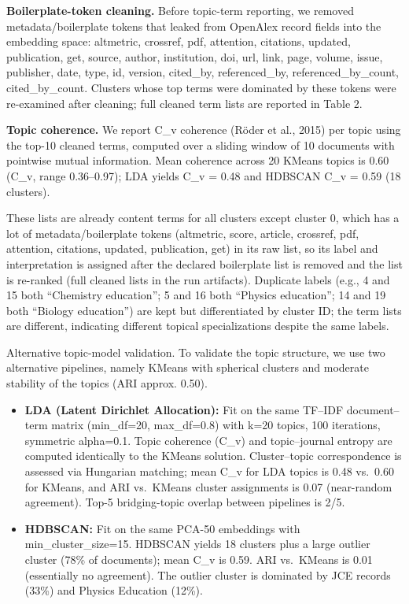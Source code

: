 \documentclass[pdflatex,sn-apa]{sn-jnl}
\providecommand{\tightlist}{\setlength{\itemsep}{0pt}\setlength{\parskip}{0pt}}
\begin{document}
\textbf{Boilerplate-token cleaning.} Before topic-term reporting, we
removed metadata/boilerplate tokens that leaked from OpenAlex record
fields into the embedding space: altmetric, crossref, pdf, attention,
citations, updated, publication, get, source, author, institution, doi,
url, link, page, volume, issue, publisher, date, type, id, version,
cited\_by, referenced\_by, referenced\_by\_count, cited\_by\_count.
Clusters whose top terms were dominated by these tokens were re-examined
after cleaning; full cleaned term lists are reported in Table 2.

\textbf{Topic coherence.} We report C\_v coherence (Röder et al., 2015)
per topic using the top-10 cleaned terms, computed over a sliding window
of 10 documents with pointwise mutual information. Mean coherence across
20 KMeans topics is 0.60 (C\_v, range 0.36--0.97); LDA yields C\_v =
0.48 and HDBSCAN C\_v = 0.59 (18 clusters).

These lists are already content terms for all clusters except cluster 0,
which has a lot of metadata/boilerplate tokens (altmetric, score,
article, crossref, pdf, attention, citations, updated, publication, get)
in its raw list, so its label and interpretation is assigned after the
declared boilerplate list is removed and the list is re-ranked (full
cleaned lists in the run artifacts). Duplicate labels (e.g., 4 and 15
both ``Chemistry education''; 5 and 16 both ``Physics education''; 14
and 19 both ``Biology education'') are kept but differentiated by
cluster ID; the term lists are different, indicating different topical
specializations despite the same labels.

Alternative topic-model validation. To validate the topic structure, we
use two alternative pipelines, namely KMeans with spherical clusters and
moderate stability of the topics (ARI approx. 0.50).

\begin{itemize}
\tightlist
\item
  \textbf{LDA (Latent Dirichlet Allocation):} Fit on the same TF--IDF
  document--term matrix (min\_df=20, max\_df=0.8) with k=20 topics, 100
  iterations, symmetric alpha=0.1. Topic coherence (C\_v) and
  topic--journal entropy are computed identically to the KMeans
  solution. Cluster--topic correspondence is assessed via Hungarian
  matching; mean C\_v for LDA topics is 0.48 vs.~0.60 for KMeans, and
  ARI vs.~KMeans cluster assignments is 0.07 (near-random agreement).
  Top-5 bridging-topic overlap between pipelines is 2/5.
\item
  \textbf{HDBSCAN:} Fit on the same PCA-50 embeddings with
  min\_cluster\_size=15. HDBSCAN yields 18 clusters plus a large outlier
  cluster (78\% of documents); mean C\_v is 0.59. ARI vs.~KMeans is 0.01
  (essentially no agreement). The outlier cluster is dominated by JCE
  records (33\%) and Physics Education (12\%).
\end{itemize}
\end{document}
